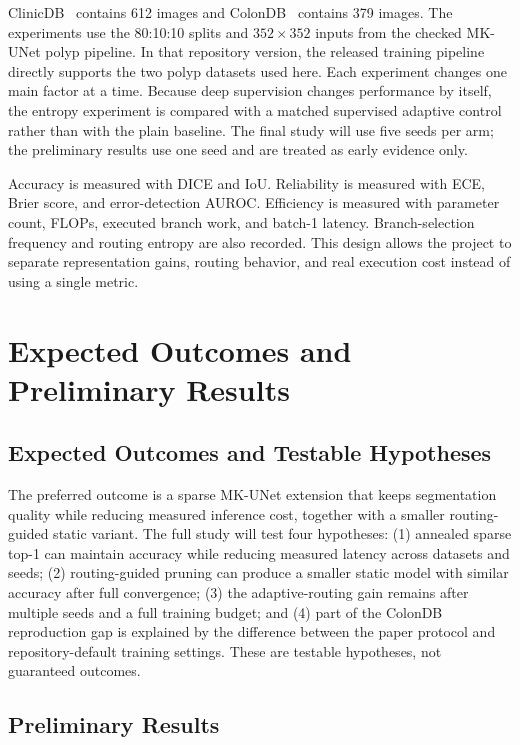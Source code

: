 \documentclass[10pt,a4paper]{article}
\begin{document}
ClinicDB~\cite{bernal2015clinicdb} contains 612 images and ColonDB~\cite{vazquez2017colondb} contains 379 images. The experiments use the 80:10:10 splits and $352\times352$ inputs from the checked MK-UNet polyp pipeline. In that repository version, the released training pipeline directly supports the two polyp datasets used here. Each experiment changes one main factor at a time. Because deep supervision changes performance by itself, the entropy experiment is compared with a matched supervised adaptive control rather than with the plain baseline. The final study will use five seeds per arm; the preliminary results use one seed and are treated as early evidence only.

Accuracy is measured with DICE and IoU. Reliability is measured with ECE, Brier score, and error-detection AUROC. Efficiency is measured with parameter count, FLOPs, executed branch work, and batch-1 latency. Branch-selection frequency and routing entropy are also recorded. This design allows the project to separate representation gains, routing behavior, and real execution cost instead of using a single metric.

\section{Expected Outcomes and Preliminary Results}

\subsection{Expected Outcomes and Testable Hypotheses}

The preferred outcome is a sparse MK-UNet extension that keeps segmentation quality while reducing measured inference cost, together with a smaller routing-guided static variant. The full study will test four hypotheses: (1) annealed sparse top-1 can maintain accuracy while reducing measured latency across datasets and seeds; (2) routing-guided pruning can produce a smaller static model with similar accuracy after full convergence; (3) the adaptive-routing gain remains after multiple seeds and a full training budget; and (4) part of the ColonDB reproduction gap is explained by the difference between the paper protocol and repository-default training settings. These are testable hypotheses, not guaranteed outcomes.

\subsection{Preliminary Results}
\end{document}
